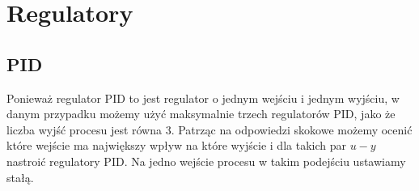 \chapter{Regulatory}

\section{PID}

Ponieważ regulator PID to jest regulator o jednym wejściu i jednym wyjściu, w danym przypadku możemy użyć maksymalnie trzech regulatorów PID, jako że liczba wyjść procesu jest równa 3. Patrząc na odpowiedzi skokowe możemy ocenić które wejście ma największy wpływ na które wyjście i dla takich par $u - y$ nastroić regulatory PID. Na jedno wejście procesu w takim podejściu ustawiamy stałą.

